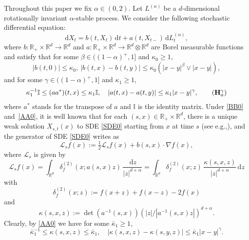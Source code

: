 \documentclass[11pt]{article}
\newcommand{\eg}{e.g.,\xspace}
\numberwithin{equation}{section}\providecommand{\asymp}{\mathrel{\sim}}
\newcommand{\rd}{\mathrm{d}}
\theoremstyle{plain}
\theoremstyle{definition}
\newcommand\cL{{\mathcal L}}
\newcommand\mI{\mathbb{I}}
\newcommand\mR{\mathbb{R}}
\newcommand\1{{\mathbf{1}}}
\newcommand\sL{{\mathscr L}}
\newcommand{\dif}{\,\mathrm{d}}
\begin{document}
Throughout this paper we fix $\alpha\in(0,2)$. Let $L^{(\alpha)}$ be a $d$-dimensional rotationally invariant $\alpha$-stable process.
We consider the following stochastic differential equation:
\begin{equation}\label{SDE0}
\rd X_t=b(t,X_t)\dif t+a(t,X_{t-})\dif L^{(\alpha)}_t,
\end{equation}
where $b:\mR_+\times\mR^d\to\mR^d$ and $a:\mR_+\times\mR^d\to\mR^d\otimes\mR^d$ are Borel measurable functions and satisfy
that for some $\beta\in((1-\alpha)^+,1]$ and $\kappa_0\geq 1$,
\begin{equation}\label{BB0}
|b(t,0)|\le \kappa_0,\ |b(t,x)-b(t,y)|\leq\kappa_0(|x-y|^\beta\vee|x-y|),\tag{$\mathbf H^\beta_b$}
\end{equation}
and
for some $\gamma\in((1-\alpha)^+,1]$ and $\kappa_1\geq 1$,
\begin{equation}\label{AA0}
\kappa_1^{-1}\mI\leq (aa^*)(t,x)\leq\kappa_1\mI,\quad |a(t,x)-a(t,y)|\leq\kappa_1|x-y|^{\gamma}, \tag{$\mathbf H^{\gamma}_a$}
\end{equation}
where $a^*$ stands for the transpose of $a$ and $\mI$ is the identity matrix.
Under \eqref{BB0} and~\eqref{AA0}, it is well known that
for each $(s,x)\in\mR_+\times\mR^d$,
there is a unique weak solution
$X_{s,t}(x)$ to SDE \eqref{SDE0} starting from $x$ at time $s$ (see \eg \cite[Th.\,1.1]{CZZ}),
and the generator of SDE \eqref{SDE0} writes as
\begin{equation*}
\sL_{s} f(x):=\tfrac12\cL_{s} f(x)+b(s,x)\cdot\nabla f(x),
\end{equation*}
where $\cL_{s}$ is given by\vspace*{-3pt}
\begin{equation}\label{GEN_STABLE_LIKE}
\cL_{s} f(x)=\int_{\mR^d}\delta^{(2)}_f(x;a(s,x)z)\,\frac{\dif z}{|z|^{d+\alpha}}=\int_{\mR^d}\delta^{(2)}_f(x;z)\,\frac{\kappa(s,x,z)}{|z|^{d+\alpha}}\,\rd z
\end{equation}
with\vspace*{-3pt}
\begin{equation}\label{DEF_DELTA_2}
\delta^{(2)}_f(x;z):=f(x+z)+f(x-z)-2f(x)
\end{equation}
and\vspace*{-3pt}
\begin{equation}\label{KA1}
\kappa(s,x,z):=\det(a^{-1}(s,x))(|z|/|a^{-1}(s,x)z|)^{d+\alpha}.
\end{equation}
Clearly, by \eqref{AA0} we have for some $\bar\kappa_1\geq 1$,
\begin{equation}\label{AA2}
\bar\kappa^{-1}_1\leq \kappa(s,x,z)\leq\bar\kappa_1,\quad |\kappa(s,x,z)-\kappa(s,y,z)|\leq\bar\kappa_1|x-y|^{\gamma}.
\end{equation}
\end{document}
